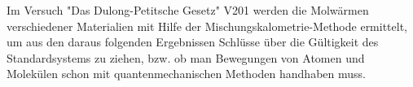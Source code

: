 Im Versuch "Das Dulong-Petitsche Gesetz"  V201 werden die Molwärmen
verschiedener Materialien mit Hilfe der Mischungskalometrie-Methode ermittelt,
um aus den daraus folgenden Ergebnissen Schlüsse über die Gültigkeit des Standardsystems zu ziehen, 
bzw. ob man Bewegungen von Atomen und Molekülen schon mit quantenmechanischen Methoden handhaben muss.
